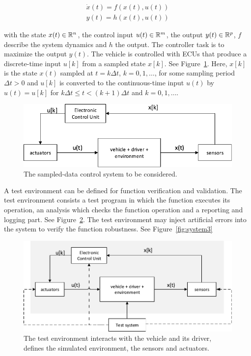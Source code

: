 \documentclass[a4paper, fleqn]{cas-dc}
\begin{document}
	\begin{equation}					
		\begin{aligned}
			\dot{x}(t) = f(x(t),u(t)) \\				
			y(t) = h(x(t),u(t))
		\end{aligned}	
	\end{equation}
	
	with the state $x(t)\in\mathbb R^n$, the control input $u(t)\in\mathbb R^m$, the output $y(t)\in\mathbb R^p$, $f$ describe the system dynamics and $h$ the output. The controller task is to maximize the output $y(t)$. The vehicle is controlled with ECUs that produce a discrete-time input $u[k]$ from a sampled state $x[k]$. See Figure~\ref{fig:system1}. Here, $x[k]$ is the state $x(t)$ sampled at $t = k\Delta t$, $k=0, 1, \ldots$, for some sampling period $\Delta t > 0$ and $u[k]$ is converted to the continuous-time input $u(t)$ by $u(t) = u[k]$ for $k \Delta t\leq t<(k+1)\Delta t$ and $k=0, 1, \ldots$.				
	
	\begin{figure}[h]
		\begin{center}
			\includegraphics[scale=0.5]{figures/system1_.pdf}
			\caption{The sampled-data control system to be considered.}
			\label{fig:system1}
		\end{center}
	\end{figure}
	
	A test environment can be defined for function verification and validation. The test environment consists a test program in which the function executes its operation, an analysis which checks the function operation and a reporting and logging part. See Figure~\ref{fig:system2}. The test environment may inject artificial errors into the system to verify the function robustness. See Figure~\ref{fig:system3}
	
	\begin{figure}[h]
		\begin{center}
			\includegraphics[scale=0.5]{figures/system2_.pdf}
			\caption{The test environment interacts with the vehicle and its driver, defines the simulated environment, the sensors and actuators.}
			\label{fig:system2}
		\end{center}
	\end{figure}
	
\end{document}
